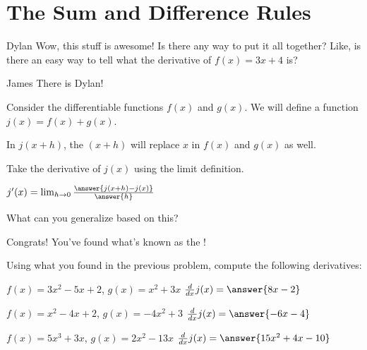 \documentclass{ximera}
\begin{document}
\section{The Sum and Difference Rules}
\begin{dialogue}
\item[Dylan] Wow, this stuff is awesome! Is there any way to put it all together? Like, is there an easy way to tell what the derivative of $f(x) = 3x+4$ is?
\item[James] There is Dylan!
\end{dialogue}

\begin{question}
Consider the differentiable functions $f(x)$ and $g(x)$. We will define a function $j(x) = f(x) + g(x)$.

\begin{hint}
In $j(x+h)$, the $(x+h)$ will replace $x$ in $f(x)$ and $g(x)$ as well.
\end{hint}
Take the derivative of $j(x)$ using the limit definition.

$j'(x) =  \lim_{h\to 0} \frac{\answer{j(x+h)-j(x)}}{\answer{h}}$

What can you generalize based on this?

\begin{multipleChoice}
\end{multipleChoice}
\begin{feedback}[correct]
Congrats! You've found what's known as the !
\end{feedback}
\end{question}
\begin{question}
Using what you found in the previous problem, compute the following derivatives:

$f(x) = 3x^2 - 5x + 2$, $g(x) = x^2 + 3x$ \hspace{11mm} $\frac{d}{dx}j(x) =  \answer{8x-2}$

$f(x) = x^2 - 4x + 2$, $g(x) = -4x^2 + 3$ \hspace{10mm} $\frac{d}{dx}j(x) = \answer{-6x-4}$

$f(x) = 5x^3 + 3x$, $g(x) = 2x^2 - 13x$ \hspace{13mm} $\frac{d}{dx}j(x) =  \answer{15x^2+4x-10}$
\end{question}
\end{document}

